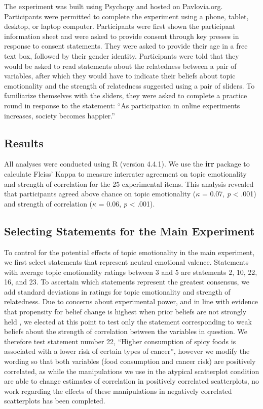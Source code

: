 \documentclass[manuscript,screen,review,anonymous]{acmart}
\begin{document}
The experiment was built using Psychopy \citep{pierce_2019} and hosted
on Pavlovia.org. Participants were permitted to complete the experiment
using a phone, tablet, desktop, or laptop computer. Participants were
first shown the participant information sheet and were asked to provide
consent through key presses in response to consent statements. They were
asked to provide their age in a free text box, followed by their gender
identity. Participants were told that they would be asked to read
statements about the relatedness between a pair of variables, after
which they would have to indicate their beliefs about topic emotionality
and the strength of relatedness suggested using a pair of sliders. To
familiarize themselves with the sliders, they were asked to complete a
practice round in response to the statement: ``As participation in
online experiments increases, society becomes happier.''

\subsection{Results}\label{sec-results-pre}

All analyses were conducted using R (version 4.4.1). We use the
\textbf{irr} package to calculate Fleiss' Kappa to measure interrater
agreement on topic emotionality and strength of correlation for the 25
experimental items. This analysis revealed that participants agreed
above chance on topic emotionality (\(\kappa\) = 0.07, \emph{p}
\textless{} .001) and strength of correlation (\(\kappa\) = 0.06,
\emph{p} \textless{} .001).

\subsection{Selecting Statements for the Main
Experiment}\label{sec-selecting-statements}

To control for the potential effects of topic emotionality in the main
experiment, we first select statements that represent neutral emotional
valence. Statements with average topic emotionality ratings between 3
and 5 are statements 2, 10, 22, 16, and 23. To ascertain which
statements represent the greatest consensus, we add standard deviations
in ratings for topic emotionality and strength of relatedness. Due to
concerns about experimental power, and in line with evidence that
propensity for belief change is highest when prior beliefs are not
strongly held \citep{xiong_2022, markant_2023}, we elected at this point
to test only the statement corresponding to weak beliefs about the
strength of correlation between the variables in question. We therefore
test statement number 22, ``Higher consumption of spicy foods is
associated with a lower risk of certain types of cancer'', however we
modify the wording so that both variables (food consumption and cancer
risk) are positively correlated, as while the manipulations we use in
the atypical scatterplot condition are able to change estimates of
correlation in positively correlated scatterplots, no work regarding the
effects of these manipulations in negatively correlated scatterplots has
been completed.
\end{document}
